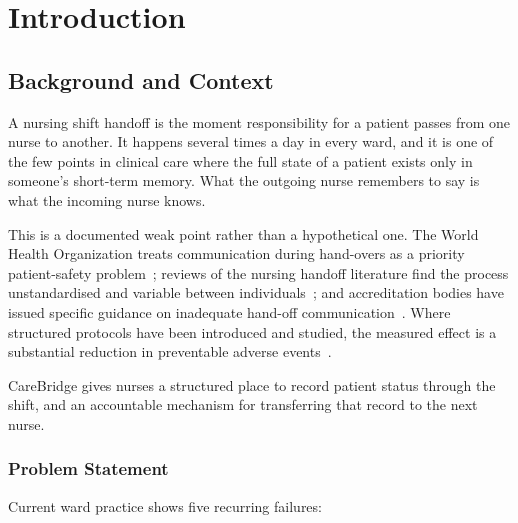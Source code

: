 \documentclass{tietreport}
\author{%
  \texttt{102XXXXXXX} Arnav Sharma \\
  \texttt{102XXXXXXX} Dhruv Dwivedi \\
  \texttt{102XXXXXXX} Pratham Nandwani \\
  \texttt{102XXXXXXX} Jalaj Poonia%
}
\begin{document}
\maketitle

\tableofcontents


\chapter{Introduction}

\section{Background and Context}

A nursing shift handoff is the moment responsibility for a
patient passes from one nurse to another. It happens several
times a day in every ward, and it is one of the few points
in clinical care where the full state of a patient exists
only in someone's short-term memory. What the outgoing nurse
remembers to say is what the incoming nurse knows.

This is a documented weak point rather than a hypothetical
one. The World Health Organization treats communication
during hand-overs as a priority patient-safety
problem~\cite{who2007handover}; reviews of the nursing
handoff literature find the process unstandardised and
variable between individuals~\cite{riesenberg2010handoffs};
and accreditation bodies have issued specific guidance on
inadequate hand-off
communication~\cite{jointcommission2017handoff}. Where
structured protocols have been introduced and studied, the
measured effect is a substantial reduction in preventable
adverse events~\cite{starmer2014ipass}.

CareBridge gives nurses a structured place to record patient
status through the shift, and an accountable mechanism for
transferring that record to the next nurse.

\subsection{Problem Statement}

Current ward practice shows five recurring failures:
\end{document}
